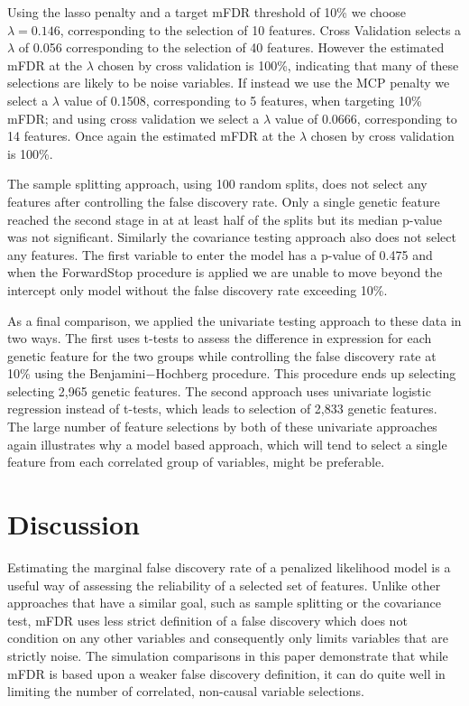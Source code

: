 Using the lasso penalty and a target mFDR threshold of 10\% we choose $\lambda = 0.146$, corresponding to the selection of 10 features.  Cross Validation selects a $\lambda$ of 0.056 corresponding to the selection of 40 features. However the estimated mFDR at the $\lambda$ chosen by cross validation is 100\%, indicating that many of these selections are likely to be noise variables. If instead we use the MCP penalty we select a $\lambda$ value of 0.1508, corresponding to 5 features, when targeting 10\% mFDR; and using cross validation we select a $\lambda$ value of 0.0666, corresponding to 14 features. Once again the estimated mFDR at the $\lambda$ chosen by cross validation is 100\%.  

The sample splitting approach, using 100 random splits, does not select any features after controlling the false discovery rate. Only a single genetic feature reached the second stage in at at least half of the splits but its median p-value was not significant. Similarly the covariance testing approach also does not select any features.  The first variable to enter the model has a p-value of 0.475 and when the ForwardStop procedure is applied we are unable to move beyond the intercept only model without the false discovery rate exceeding 10\%.

As a final comparison, we applied the univariate testing approach to these data in two ways. The first uses t-tests to assess the difference in expression for each genetic feature for the two groups while controlling the false discovery rate at 10\% using the Benjamini$-$Hochberg procedure.  This procedure ends up selecting selecting 2,965 genetic features. The second approach uses univariate logistic regression instead of t-tests, which leads to selection of 2,833 genetic features. The large number of feature selections by both of these univariate approaches again illustrates why a model based approach, which will tend to select a single feature from each correlated group of variables, might be preferable. 

\section{Discussion}
Estimating the marginal false discovery rate of a penalized likelihood model is a useful way of assessing the reliability of a selected set of features. Unlike other approaches that have a similar goal, such as sample splitting or the covariance test, mFDR uses less strict definition of a false discovery which does not condition on any other variables and consequently only limits variables that are strictly noise. The simulation comparisons in this paper demonstrate that while mFDR is based upon a weaker false discovery definition, it can do quite well in limiting the number of correlated, non-causal variable selections.


